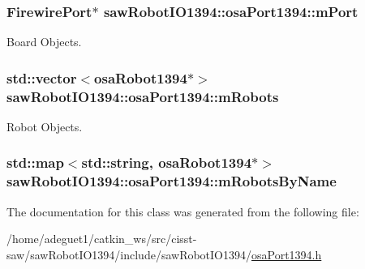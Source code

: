 \hypertarget{classsaw_robot_i_o1394_1_1osa_port1394_aa0d8a2385466f6861d9b999f2c73406c}{
\subsubsection[{m\-Port}]{\setlength{\rightskip}{0pt plus 5cm}Firewire\-Port$\ast$ saw\-Robot\-I\-O1394\-::osa\-Port1394\-::m\-Port\hspace{0.3cm}{\ttfamily [protected]}}}\label{classsaw_robot_i_o1394_1_1osa_port1394_aa0d8a2385466f6861d9b999f2c73406c}


Board Objects. 

\hypertarget{classsaw_robot_i_o1394_1_1osa_port1394_a3cb60cf6a18b8e0b91576636cb231ea3}{
\subsubsection[{m\-Robots}]{\setlength{\rightskip}{0pt plus 5cm}std\-::vector$<${\bf osa\-Robot1394}$\ast$$>$ saw\-Robot\-I\-O1394\-::osa\-Port1394\-::m\-Robots\hspace{0.3cm}{\ttfamily [protected]}}}\label{classsaw_robot_i_o1394_1_1osa_port1394_a3cb60cf6a18b8e0b91576636cb231ea3}


Robot Objects. 

\hypertarget{classsaw_robot_i_o1394_1_1osa_port1394_a43429f6b99e3a27ba60a626d3ab83367}{
\subsubsection[{m\-Robots\-By\-Name}]{\setlength{\rightskip}{0pt plus 5cm}std\-::map$<$std\-::string, {\bf osa\-Robot1394}$\ast$$>$ saw\-Robot\-I\-O1394\-::osa\-Port1394\-::m\-Robots\-By\-Name\hspace{0.3cm}{\ttfamily [protected]}}}\label{classsaw_robot_i_o1394_1_1osa_port1394_a43429f6b99e3a27ba60a626d3ab83367}


The documentation for this class was generated from the following file\-:\begin{DoxyCompactItemize}
\item 
/home/adeguet1/catkin\-\_\-ws/src/cisst-\/saw/saw\-Robot\-I\-O1394/include/saw\-Robot\-I\-O1394/\hyperlink{osa_port1394_8h}{osa\-Port1394.\-h}\end{DoxyCompactItemize}
